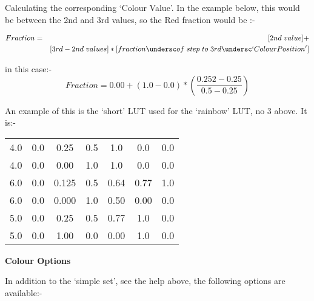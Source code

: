 \begin{small}
{{   Calculating the corresponding `Colour Value'. In the example below,
     this would be between the 2nd and 3rd values, so the Red fraction
     would be :-

\begin{eqnarray}
Fraction & = & [2nd{\hspace{0.3em}}value] + \nonumber \\
         &    & [3rd-2nd{\hspace{0.3em}}values]*[fraction{
       \undersc}of{\hspace{0.3em}}step{\hspace{0.3em}}to{\hspace{0.3em}}3rd{
       \undersc}`Colour Position'] \nonumber
\end{eqnarray}

in this case:-
$$     Fraction = 0.00 + (1.0-0.0)*(\frac{0.252-0.25}{0.5-0.25}) $$

  An example of this is the `short' LUT used for the `rainbow' LUT, no 3
  above. It is:-

\begin{tabular}{ccccccc}
     4.0& 0.0& 0.25&  0.5&  1.0&  0.0& 0.0 \\
     4.0& 0.0& 0.00&  1.0&  1.0&  0.0& 0.0 \\
     6.0& 0.0& 0.125& 0.5& 0.64& 0.77& 1.0 \\
     6.0& 0.0& 0.000& 1.0& 0.50& 0.00& 0.0 \\
     5.0& 0.0& 0.25&  0.5& 0.77&  1.0& 0.0 \\
     5.0& 0.0& 1.00&  0.0& 0.00&  1.0& 0.0 \\
\end{tabular}

\vspace*{1mm}
{\bf Colour Options}
\vspace*{1mm}

  In addition to the `simple set', see the help above, the
  following options are available:-

}}
\end{small}

